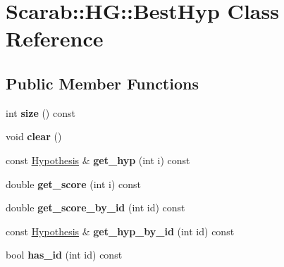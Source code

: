 \hypertarget{class_scarab_1_1_h_g_1_1_best_hyp}{
\section{Scarab::HG::BestHyp Class Reference}
\label{class_scarab_1_1_h_g_1_1_best_hyp}
}
\subsection*{Public Member Functions}
\begin{DoxyCompactItemize}
\item 
\hypertarget{class_scarab_1_1_h_g_1_1_best_hyp_a8ebb56ed4cd363e793bc13936551a58a}{
int {\bfseries size} () const }
\label{class_scarab_1_1_h_g_1_1_best_hyp_a8ebb56ed4cd363e793bc13936551a58a}

\item 
\hypertarget{class_scarab_1_1_h_g_1_1_best_hyp_a3c032ac35ce142d64fdad17b8950b493}{
void {\bfseries clear} ()}
\label{class_scarab_1_1_h_g_1_1_best_hyp_a3c032ac35ce142d64fdad17b8950b493}

\item 
\hypertarget{class_scarab_1_1_h_g_1_1_best_hyp_a33ebfb0c6fc093b02e8d2e33082fd8a9}{
const \hyperlink{struct_scarab_1_1_h_g_1_1_hypothesis}{Hypothesis} \& {\bfseries get\_\-hyp} (int i) const }
\label{class_scarab_1_1_h_g_1_1_best_hyp_a33ebfb0c6fc093b02e8d2e33082fd8a9}

\item 
\hypertarget{class_scarab_1_1_h_g_1_1_best_hyp_afd75d0946faf6a48d113d815c1f86bce}{
double {\bfseries get\_\-score} (int i) const }
\label{class_scarab_1_1_h_g_1_1_best_hyp_afd75d0946faf6a48d113d815c1f86bce}

\item 
\hypertarget{class_scarab_1_1_h_g_1_1_best_hyp_a60998ae47c3087d809d0ab1be0d2c21a}{
double {\bfseries get\_\-score\_\-by\_\-id} (int id) const }
\label{class_scarab_1_1_h_g_1_1_best_hyp_a60998ae47c3087d809d0ab1be0d2c21a}

\item 
\hypertarget{class_scarab_1_1_h_g_1_1_best_hyp_ad68702666a75575acffd113f9038e92a}{
const \hyperlink{struct_scarab_1_1_h_g_1_1_hypothesis}{Hypothesis} \& {\bfseries get\_\-hyp\_\-by\_\-id} (int id) const }
\label{class_scarab_1_1_h_g_1_1_best_hyp_ad68702666a75575acffd113f9038e92a}

\item 
\hypertarget{class_scarab_1_1_h_g_1_1_best_hyp_acdb194cd10fe47e64ac7c96de296cb4e}{
bool {\bfseries has\_\-id} (int id) const }
\label{class_scarab_1_1_h_g_1_1_best_hyp_acdb194cd10fe47e64ac7c96de296cb4e}


\end{DoxyCompactItemize}
